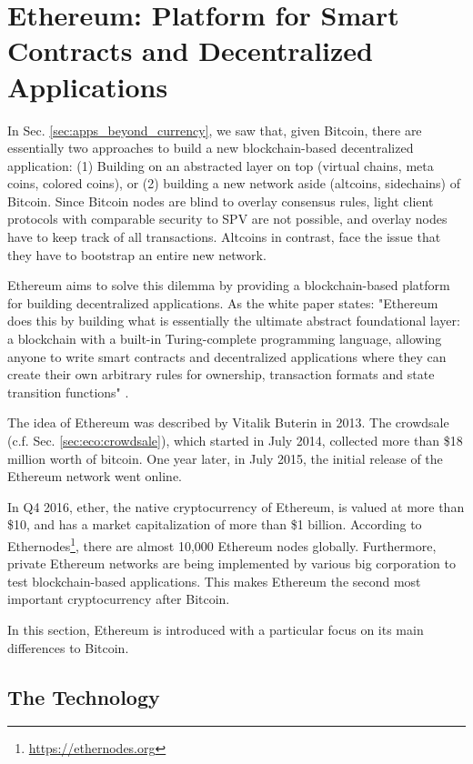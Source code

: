 \section{Ethereum: Platform for Smart Contracts and Decentralized Applications}
\label{sec:ethereum}

In Sec. \ref{sec:apps_beyond_currency}, we saw that, given Bitcoin, there are essentially two approaches to build a new blockchain-based decentralized application: (1) Building on an abstracted layer on top (virtual chains, meta coins, colored coins), or (2) building a new network aside (altcoins, sidechains) of Bitcoin. Since Bitcoin nodes are blind to overlay consensus rules, light client protocols with comparable security to \ac{SPV} are not possible, and overlay nodes have to keep track of all transactions. Altcoins in contrast, face the issue that they have to bootstrap an entire new network.

Ethereum aims to solve this dilemma by providing a blockchain-based platform for building decentralized applications. As the white paper states: "Ethereum does this by building what is essentially the ultimate abstract foundational layer: a blockchain with a built-in Turing-complete programming language, allowing anyone to write smart contracts and decentralized applications where they can create their own arbitrary rules for ownership, transaction formats and state transition functions" \parencite{ethereumWhite}.

The idea of Ethereum was described by Vitalik Buterin in 2013. The crowdsale (c.f. Sec. \ref{sec:eco:crowdsale}), which started in July 2014, collected more than \$18 million worth of bitcoin. One year later, in July 2015, the initial release of the Ethereum network went online. 

In Q4 2016, ether, the native cryptocurrency of Ethereum, is valued at more than \$10, and has a market capitalization of more than \$1 billion. According to Ethernodes\footnote{\url{https://ethernodes.org}}, there are almost 10,000 Ethereum nodes globally. Furthermore, private Ethereum networks are being implemented by various big corporation to test blockchain-based applications. This makes Ethereum the second most important cryptocurrency after Bitcoin.

In this section, Ethereum is introduced with a particular focus on its main differences to Bitcoin. 

\subsection{The Technology}
\label{sec:ethereum:tech}

